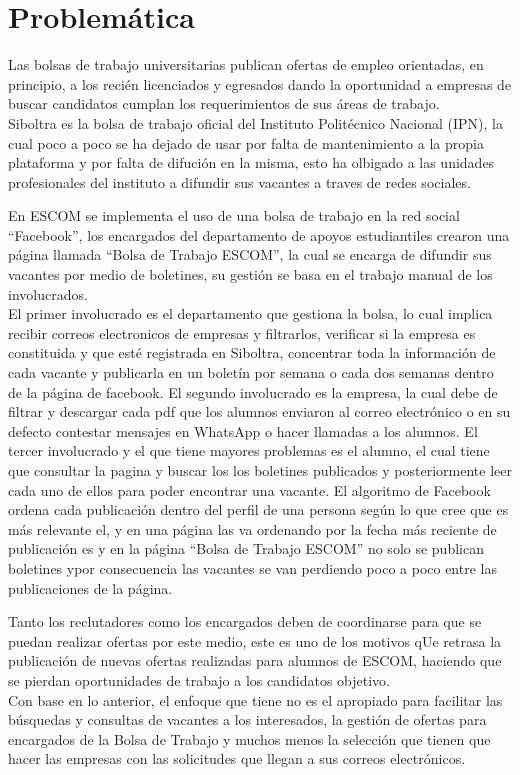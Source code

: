 \clearpage
\section{Problemática}

Las bolsas de trabajo universitarias publican ofertas de empleo orientadas, en principio, a 
los recién licenciados y egresados dando la oportunidad a empresas de buscar candidatos cumplan los requerimientos de sus áreas
de trabajo.\cite{Universia} \\
\newline
Siboltra es la bolsa de trabajo oficial del Instituto Politécnico Nacional (IPN), la cual poco a poco se ha dejado de usar
por falta de mantenimiento a la propia plataforma y por falta de difución en la misma, esto ha olbigado a las unidades profesionales
del instituto a difundir sus vacantes a traves de redes sociales.

En ESCOM se implementa el uso de una bolsa de trabajo en la red social ``Facebook'', los encargados del departamento
de apoyos estudiantiles crearon una página llamada ``Bolsa de Trabajo ESCOM'', la cual se encarga de difundir sus vacantes por medio 
de boletines, su gestión se basa en el trabajo manual de los involucrados. \\
\newline
El primer involucrado es el departamento que gestiona la bolsa, lo cual implica recibir correos electronicos de empresas y filtrarlos, verificar si la empresa es constituida y que esté registrada
en Siboltra, concentrar toda la información de cada vacante y publicarla en un boletín por semana o cada dos semanas dentro de la página de facebook.
El segundo involucrado es la empresa, la cual debe de filtrar y descargar cada pdf que los alumnos enviaron al correo electrónico o 
en su defecto contestar mensajes en WhatsApp o hacer llamadas a los alumnos.\newline
El tercer involucrado y el que tiene mayores problemas es el alumno, el cual tiene que consultar la pagina y buscar los los boletines 
publicados y posteriormente leer cada uno de ellos para poder encontrar una vacante. El algoritmo de Facebook ordena cada 
publicación dentro del perfil de una persona según lo que cree que es más relevante el, y en una página las va ordenando 
por la fecha más reciente de publicación es y en la   página ``Bolsa de Trabajo ESCOM'' no solo se publican boletines ypor consecuencia
las vacantes se van perdiendo poco a poco entre las publicaciones de la página.\\
\newline

Tanto los reclutadores como los encargados deben de coordinarse para que se puedan realizar ofertas por este medio, este  es uno 
de los motivos qUe retrasa la publicación de nuevas ofertas realizadas para alumnos de ESCOM, haciendo que se pierdan oportunidades
 de trabajo a los candidatos objetivo.\\
\newline
Con base en lo anterior, el enfoque que tiene no es el apropiado para facilitar las búsquedas y consultas de vacantes a los interesados, la gestión
de ofertas para encargados de la Bolsa de Trabajo y muchos menos la selección que tienen que hacer las empresas con las solicitudes
que llegan a sus correos electrónicos.